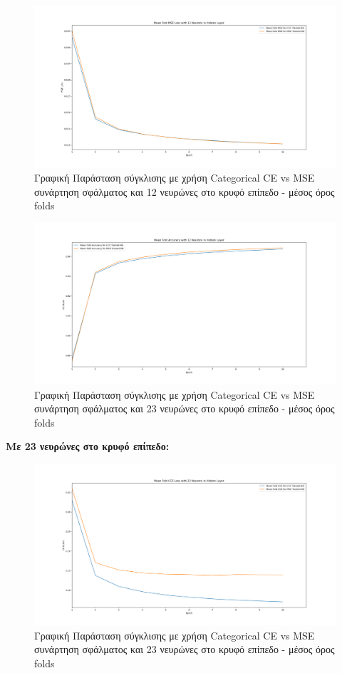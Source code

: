 \documentclass[12pt,a4paper]{article}
\begin{document}
\begin{figure}[H]
	\includegraphics[width=\textwidth]{14. CCE vs MSE - MSE Loss - 12 Neurons - Mean.png}
	\caption{Γραφική Παράσταση σύγκλισης με χρήση Categorical CE vs MSE συνάρτηση σφάλματος και 12 νευρώνες στο κρυφό επίπεδο - μέσος όρος folds}
\end{figure}

\begin{figure}[H]
	\includegraphics[width=\textwidth]{15. CCE vs MSE - Accuracy - 12 Neurons - Mean.png}
	\caption{Γραφική Παράσταση σύγκλισης με χρήση Categorical CE vs MSE συνάρτηση σφάλματος και 23 νευρώνες στο κρυφό επίπεδο - μέσος όρος folds}
\end{figure}

\textbf{Με 23 νευρώνες στο κρυφό επίπεδο:}

\begin{figure}[H]
	\includegraphics[width=\textwidth]{16. CCE vs MSE - CCE Loss - 23 Neurons - Mean.png}
	\caption{Γραφική Παράσταση σύγκλισης με χρήση Categorical CE vs MSE συνάρτηση σφάλματος και 23 νευρώνες στο κρυφό επίπεδο - μέσος όρος folds}
\end{figure}
\end{document}
